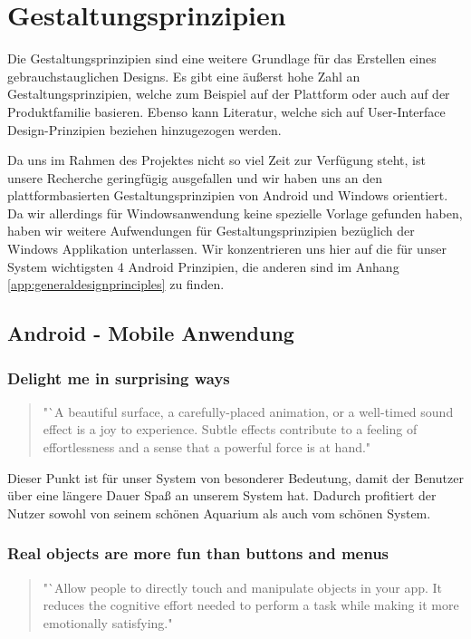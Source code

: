 \chapter{Gestaltungsprinzipien}
Die Gestaltungsprinzipien sind eine weitere Grundlage für das Erstellen eines gebrauchstauglichen Designs. Es gibt eine äußerst hohe Zahl an Gestaltungsprinzipien, welche zum Beispiel auf der Plattform oder auch auf der Produktfamilie basieren. Ebenso kann Literatur, welche sich auf User-Interface Design-Prinzipien beziehen hinzugezogen werden. 

Da uns im Rahmen des Projektes nicht so viel Zeit zur Verfügung steht, ist unsere Recherche geringfügig ausgefallen und wir haben uns an den plattformbasierten Gestaltungsprinzipien von Android \cite{Android:designprinciples} und Windows orientiert. Da wir allerdings für Windowsanwendung keine spezielle Vorlage gefunden haben, haben wir weitere Aufwendungen für Gestaltungsprinzipien bezüglich der Windows Applikation unterlassen. Wir konzentrieren uns hier auf die für unser System wichtigsten 4 Android Prinzipien, die anderen sind im Anhang \ref{app:generaldesignprinciples} zu finden.

\section{Android - Mobile Anwendung}

\subsection{Delight me in surprising ways}
\begin{quote} "`A beautiful surface, a carefully-placed animation, or a well-timed sound effect is a joy to experience. Subtle effects contribute to a feeling of effortlessness and a sense that a powerful force is at hand."
\end{quote}

Dieser Punkt ist für unser System von besonderer Bedeutung, damit der Benutzer über eine längere Dauer Spaß an unserem System hat. Dadurch profitiert der Nutzer sowohl von seinem schönen Aquarium als auch vom schönen System.
 
\subsection{Real objects are more fun than buttons and menus}
\begin{quote} "`Allow people to directly touch and manipulate objects in your app. It reduces the cognitive effort needed to perform a task while making it more emotionally satisfying."\end{quote}


